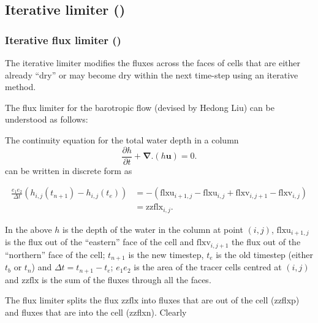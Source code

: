 \documentclass[../main/NEMO_manual]{subfiles}
\begin{document}

\subsection   [Iterative limiter (\textit{wet\_dry})]
         {Iterative limiter ()}
\label{subsec:DYN_wd_iterative_limiter}

\subsubsection [Iterative flux limiter (\textit{wet\_dry})]
         {Iterative flux limiter ()}
\label{subsubsec:DYN_wd_il_spg_limiter}

The iterative limiter modifies the fluxes across the faces of cells that are either already ``dry''
or may become dry within the next time-step using an iterative method.

The flux limiter for the barotropic flow (devised by Hedong Liu) can be understood as follows:

The continuity equation for the total water depth in a column
\begin{equation} \label{dyn_wd_continuity}
 \frac{\partial h}{\partial t} + \mathbf{\nabla.}(h\mathbf{u}) = 0 .
\end{equation}
can be written in discrete form  as

\begin{align} \label{dyn_wd_continuity_2}
\frac{e_1 e_2}{\Delta t} ( h_{i,j}(t_{n+1}) - h_{i,j}(t_e) ) 
&= - ( \mathrm{flxu}_{i+1,j} - \mathrm{flxu}_{i,j}  + \mathrm{flxv}_{i,j+1} - \mathrm{flxv}_{i,j} ) \\
&= \mathrm{zzflx}_{i,j} .
\end{align}

In the above $h$ is the depth of the water in the column at point $(i,j)$,
$\mathrm{flxu}_{i+1,j}$ is the flux out of the ``eastern'' face of the cell and
$\mathrm{flxv}_{i,j+1}$ the flux out of the ``northern'' face of the cell; $t_{n+1}$ is
the new timestep, $t_e$ is the old timestep (either $t_b$ or $t_n$) and $ \Delta t =
t_{n+1} - t_e$; $e_1 e_2$ is the area of the tracer cells centred at $(i,j)$ and
$\mathrm{zzflx}$ is the sum of the fluxes through all the faces.

The flux limiter splits the flux $\mathrm{zzflx}$ into fluxes that are out of the cell
(zzflxp) and fluxes that are into the cell (zzflxn).  Clearly
\end{document}
